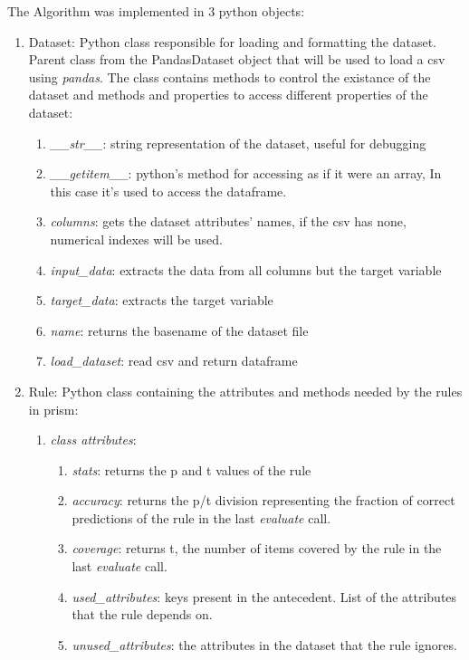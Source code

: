 The Algorithm was implemented in 3 python objects:
\begin{enumerate}
    \item Dataset: Python class responsible for loading and formatting the dataset. Parent class from the PandasDataset object that will be used to load a csv using \emph{pandas}. The class contains methods to control the existance of the dataset and methods and properties to access different properties of the dataset:
        \begin{enumerate}
            \item \emph{\_\_str\_\_}: string representation of the dataset, useful for debugging
            \item \emph{\_\_getitem\_\_}: python's method for accessing as if it were an array, In this case it's used to access the dataframe.
            \item \emph{ columns}: gets the dataset attributes' names, if the csv has none, numerical indexes will be used.
            \item \emph{input\_data}: extracts the data from all columns but the target variable
            \item \emph{target\_data}: extracts the target variable
            \item \emph{name}: returns the basename of the dataset file
            \item \emph{load\_dataset}: read csv and return dataframe
        \end{enumerate}
    \item Rule: Python class containing the attributes and methods needed by the rules in prism:
        \begin{enumerate}
            \item \emph{class attributes}: 
                \begin{enumerate}
                    \item \emph{stats}: returns the p and t values of the rule
                    \item \emph{accuracy}: returns the p/t division representing the fraction of correct predictions of the rule in the last \emph{evaluate} call.
                    \item \emph{coverage}: returns t, the number of items covered by the rule in the last \emph{evaluate} call.
                    \item \emph{used\_attributes}: keys present in the antecedent. List of the attributes that the rule depends on.
                    \item \emph{unused\_attributes}: the attributes in the dataset that the rule ignores.

\end{enumerate}
\end{enumerate}
\end{enumerate}
